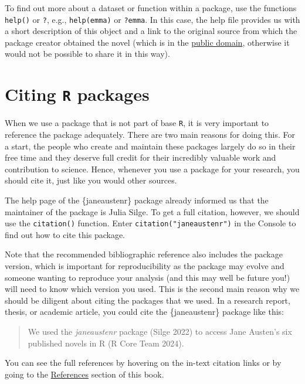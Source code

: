 \documentclass[
  letterpaper,
  DIV=11,
  numbers=noendperiod]{scrreprt}
\begin{document}
To find out more about a dataset or function within a package, use the
functions \texttt{help()} or \texttt{?}, e.g., \texttt{help(emma)} or
\texttt{?emma}. In this case, the help file provides us with a short
description of this object and a link to the original source from which
the package creator obtained the novel (which is in the
\href{https://www.gutenberg.org/help/faq.html\#what-books-does-project-gutenberg-publish}{public
domain}, otherwise it would not be possible to share it in this way).

\section{\texorpdfstring{Citing \texttt{R}
packages}{Citing R packages}}\label{citing-r-packages}

When we use a package that is not part of base \texttt{R}, it is very
important to reference the package adequately. There are two main
reasons for doing this. For a start, the people who create and maintain
these packages largely do so in their free time and they deserve full
credit for their incredibly valuable work and contribution to science.
Hence, whenever you use a package for your research, you should cite it,
just like you would other sources.

The help page of the \{janeaustenr\} package already informed us that
the maintainer of the package is Julia Silge. To get a full citation,
however, we should use the \texttt{citation()} function. Enter
\texttt{citation("janeaustenr")} in the Console to find out how to cite
this package.

Note that the recommended bibliographic reference also includes the
package version, which is important for reproducibility as the package
may evolve and someone wanting to reproduce your analysis (and this may
well be future you!) will need to know which version you used. This is
the second main reason why we should be diligent about citing the
packages that we used. In a research report, thesis, or academic
article, you could cite the \{janeaustenr\} package like this:

\begin{quote}
We used the \emph{janeaustenr} package (Silge 2022) to access Jane
Austen's six published novels in R (R Core Team 2024).
\end{quote}

You can see the full references by hovering on the in-text citation
links or by going to the
\href{https://elenlefoll.github.io/RstatsTextbook/references.html}{References}
section of this book.
\end{document}
